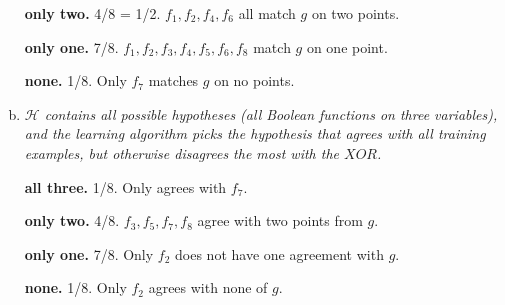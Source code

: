 \documentclass{article}
\begin{document}
\begin{enumerate}[(a)]
    \textbf{only two.} 4/8 = 1/2. $f_1, f_2, f_4, f_6$ all match $g$ on two points.


    \textbf{only one.} 7/8. $f_1, f_2, f_3, f_4, f_5, f_6, f_8$ match $g$ on one point.


    \textbf{none.} 1/8. Only $f_7$ matches $g$ on no points.

	
	\item \textit{$\mathscr{H}$ contains all possible hypotheses (all Boolean functions on three variables), and the learning algorithm picks the hypothesis that agrees with all training examples, but otherwise disagrees the most with the $XOR$.}
	  
    \textbf{all three.} 1/8. Only agrees with $f_7$.


    \textbf{only two.} 4/8. $f_3, f_5, f_7, f_8$ agree with two points from $g$.


    \textbf{only one.} 7/8. Only $f_2$ does not have one agreement with $g$.


    \textbf{none.} 1/8. Only $f_2$ agrees with none of $g$.

	
\end{enumerate}
\end{document}
